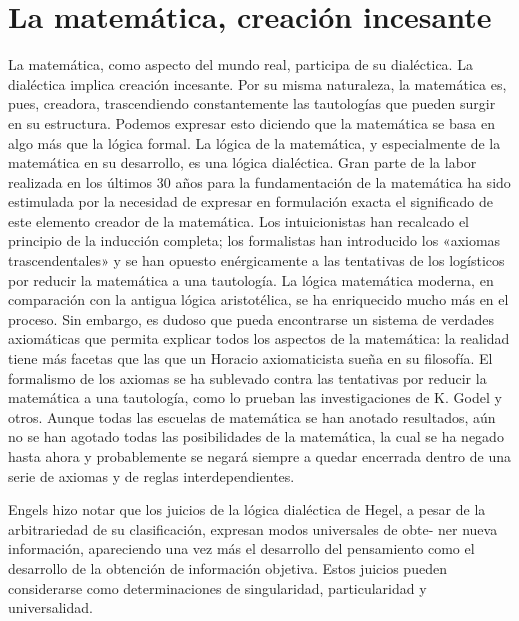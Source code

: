 \documentclass[a4paper, 12pt]{article}
\begin{document}
{{\section*{La matemática, creación incesante}

La matemática, como aspecto del mundo real, participa de su dialéctica. La
dialéctica implica creación incesante. Por su misma naturaleza, la matemática
es, pues, creadora, trascendiendo constantemente las tautologías que pueden
surgir en su estructura. Podemos expresar esto diciendo que la matemática se
basa en algo más que la lógica formal. La lógica de la matemática, y
especialmente de la matemática en su desarrollo, es una lógica dialéctica. Gran
parte de la labor realizada en los últimos 30 años para la fundamentación de la
matemática ha sido estimulada por la necesidad de expresar en formulación exacta
el significado de este elemento creador de la matemática. Los intuicionistas han
recalcado el principio de la inducción completa; los formalistas han introducido
los «axiomas trascendentales»  y se han opuesto enérgicamente a las tentativas
de los logísticos por reducir la matemática a una tautología. La lógica
matemática moderna, en comparación con la antigua lógica aristotélica, se ha
enriquecido mucho más en el proceso. Sin embargo, es dudoso que pueda
encontrarse un sistema de verdades axiomáticas que permita explicar todos los
aspectos de la matemática: la realidad tiene más facetas que las que un Horacio
axiomaticista sueña en su filosofía. El formalismo de los axiomas se ha
sublevado contra las tentativas por reducir la matemática a una tautología, como
lo prueban las investigaciones de K. Godel y otros. Aunque todas las escuelas de
matemática se han anotado resultados, aún no se han agotado todas las
posibilidades de la matemática, la cual se ha negado hasta ahora y probablemente
se negará siempre a quedar encerrada dentro de una serie de axiomas y de reglas
interdependientes.

Engels hizo notar que los juicios de la lógica dialéctica de Hegel, a pesar de
la arbitrariedad de su clasificación, expresan modos universales de obte- ner
nueva información, apareciendo una vez más el desarrollo del pensamiento como el
desarrollo de la obtención de información objetiva.  Estos juicios pueden
considerarse como determinaciones de singularidad, particularidad y
universalidad.

}}
\end{document}
